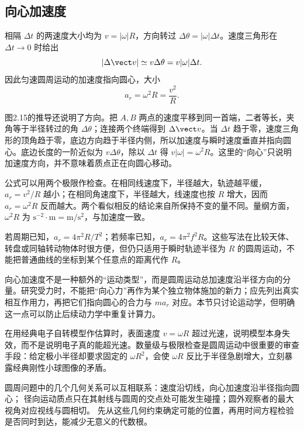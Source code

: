 \subsection{向心加速度}

\CentripetalDerivationDiagram

相隔 $\Delta t$ 的两速度大小均为 $v=|\omega|R$，方向转过 $\Delta\theta=|\omega|\Delta t$。速度三角形在 $\Delta t\to0$ 时给出
\[
 |\Delta\vect v|\simeq v\Delta\theta=v|\omega|\Delta t.
\]
因此匀速圆周运动的加速度指向圆心，大小
\begin{equation}
 \boxed{a_r=\omega^2R=\frac{v^2}{R}}.
\end{equation}

图2.15的推导还说明了方向。把 $A,B$ 两点的速度平移到同一首端，二者等长，夹角等于半径转过的角 $\Delta\theta$；连接两个终端得到 $\Delta\vect v$。当 $\Delta t$ 趋于零，速度三角形的顶角趋于零，底边方向趋于半径内侧，所以加速度与瞬时速度垂直并指向圆心。底边长度的一阶近似为 $v\Delta\theta$，除以 $\Delta t$ 得 $v|\omega|=\omega^2R$。这里的“向心”只说明加速度方向，并不意味着质点正在向圆心移动。

公式可以用两个极限作检查。在相同线速度下，半径越大，轨迹越平缓，$a_r=v^2/R$ 越小；在相同角速度下，半径越大，线速度也按 $R$ 增大，因而 $a_r=\omega^2R$ 反而越大。两个看似相反的结论来自所保持不变的量不同。量纲方面，$\omega^2R$ 为 $\mathrm{s^{-2}}\cdot\mathrm m=\mathrm{m/s^2}$，与加速度一致。

若周期已知，$a_r=4\pi^2R/T^2$；若频率已知，$a_r=4\pi^2f^2R$。这些写法在比较天体、转盘或同轴转动物体时很方便，但仍只适用于瞬时轨迹半径为 $R$ 的圆周运动，不能把普通曲线的坐标到某个任意点的距离代作 $R$。

向心加速度不是一种额外的“运动类型”，而是圆周运动总加速度沿半径方向的分量。研究受力时，不能把“向心力”再作为某个独立物体施加的新力；应先列出真实相互作用力，再把它们指向圆心的合力与 $ma_r$ 对应。本节只讨论运动学，但明确这一点可以防止后续动力学中重复计算力。

在用经典电子自转模型作估算时，表面速度 $v=\omega R$ 超过光速，说明模型本身失效，而不是说明电子真的能超光速。数量级与极限检查是圆周运动中很重要的审查手段：给定极小半径却要求固定的 $\omega R^2$，会使 $\omega R$ 反比于半径急剧增大，立刻暴露经典刚性小球图像的矛盾。

圆周问题中的几个几何关系可以互相联系：速度沿切线，向心加速度沿半径指向圆心；
径向运动质点只在其射线与圆周的交点处可能发生碰撞；圆外观察者的最大视角对应视线与圆相切。
先从这些几何约束确定可能的位置，再用时间方程检验是否同时到达，能减少无意义的代数根。

